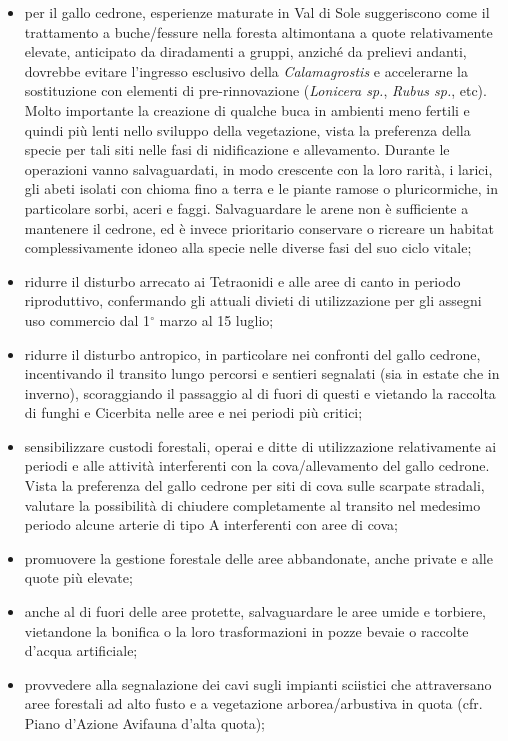 \documentclass[10pt,twoside,openany,x11names,svgnames,italian,a5paper,dvipsnames,table]{memoir}
\begin{document}
\begin{itemize}
  \item per il gallo cedrone, esperienze maturate in Val di Sole suggeriscono come il trattamento a buche/fessure nella foresta altimontana a quote relativamente elevate, anticipato da diradamenti a gruppi, anziché da prelievi andanti, dovrebbe evitare l’ingresso esclusivo della \emph{Calamagrostis} e accelerarne la sostituzione con elementi di pre-rinnovazione (\emph{Lonicera sp.}, \emph{Rubus sp.}, etc). Molto importante la creazione di qualche buca in ambienti meno fertili e quindi più lenti nello sviluppo della vegetazione, vista la preferenza della specie per tali siti nelle fasi di nidificazione e allevamento. Durante le operazioni vanno salvaguardati, in modo crescente con la loro rarità, i larici, gli abeti isolati con chioma fino a terra e le piante ramose o pluricormiche, in  particolare sorbi, aceri e faggi. Salvaguardare le arene non è sufficiente a mantenere il cedrone, ed è invece prioritario conservare o ricreare un habitat complessivamente idoneo alla specie nelle diverse fasi del suo ciclo vitale;
  \item ridurre il disturbo arrecato ai Tetraonidi e alle aree di canto in periodo riproduttivo, confermando gli attuali divieti di utilizzazione per gli assegni uso commercio dal 1$^\circ$ marzo al 15 luglio;
  \item ridurre il disturbo antropico, in particolare nei confronti del gallo cedrone, incentivando il transito lungo percorsi e sentieri segnalati (sia in estate che in inverno), scoraggiando il passaggio al di fuori di questi e vietando la raccolta di funghi e Cicerbita nelle aree e nei periodi più critici;  
  \item sensibilizzare custodi forestali, operai e ditte di utilizzazione relativamente ai periodi e alle attività interferenti con la cova/allevamento del gallo cedrone. Vista la preferenza del gallo cedrone per siti di cova sulle scarpate stradali, valutare la possibilità di chiudere completamente al transito nel medesimo periodo alcune arterie di tipo A interferenti con aree di cova;
  \item promuovere la gestione forestale delle aree abbandonate, anche private e alle quote più elevate;
  \item anche al di fuori delle aree protette, salvaguardare le aree umide e torbiere, vietandone la bonifica o la loro trasformazioni in pozze bevaie o raccolte d’acqua artificiale;
  \item provvedere alla segnalazione dei cavi sugli impianti sciistici che attraversano aree forestali ad alto fusto e a vegetazione arborea/arbustiva in quota (cfr. Piano d’Azione Avifauna d’alta quota);

\end{itemize}
\end{document}
